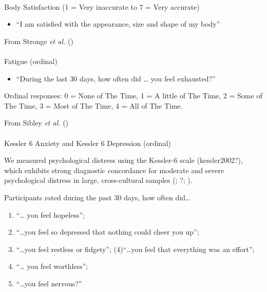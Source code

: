 \documentclass[
  single column]{article}
\makeatletter
\let\oldparagraph\paragraph
\renewcommand{\paragraph}{
    \@ifstar
      \xxxParagraphStar
      \xxxParagraphNoStar
  }
\newcommand{\xxxParagraphStar}[1]{\oldparagraph*{#1}\mbox{}}
\newcommand{\xxxParagraphNoStar}[1]{\oldparagraph{#1}\mbox{}}
\providecommand{\tightlist}{%
  \setlength{\itemsep}{0pt}\setlength{\parskip}{0pt}}\usepackage{longtable,booktabs,array}
\makeatother
\begin{document}
\paragraph{Body Satisfaction (1 = Very inaccurate to 7 = Very
accurate)}\label{body-satisfaction-1-very-inaccurate-to-7-very-accurate}

\begin{itemize}
\tightlist
\item
  ``I am satisfied with the appearance, size and shape of my body''
\end{itemize}

From Stronge \emph{et al.} ()

\paragraph{Fatigue (ordinal)}\label{fatigue-ordinal}

\begin{itemize}
\tightlist
\item
  ``During the last 30 days, how often did \ldots{} you feel
  exhausted?''
\end{itemize}

Ordinal responses: 0 = None of The Time, 1 = A little of The Time, 2 =
Some of The Time, 3 = Most of The Time, 4 = All of The Time.

From Sibley \emph{et al.} ()

\paragraph{Kessler 6 Anxiety and Kessler 6 Depression
(ordinal)}\label{kessler-6-anxiety-and-kessler-6-depression-ordinal}

We measured psychological distress using the Kessler-6 scale
(kessler2002?), which exhibits strong diagnostic concordance for
moderate and severe psychological distress in large, cross-cultural
samples (;
?;
).

Participants rated during the past 30 days, how often did\ldots{}

\begin{enumerate}
\def\labelenumi{(\arabic{enumi})}
\tightlist
\item
  ``\ldots{} you feel hopeless'';
\item
  ``\ldots you feel so depressed that nothing could cheer you up'';
\item
  ``\ldots you feel restless or fidgety''; (4)``\ldots you feel that
  everything was an effort'';
\item
  ``\ldots{} you feel worthless'';
\item
  ``\ldots you feel nervous?''
\end{enumerate}
\end{document}
